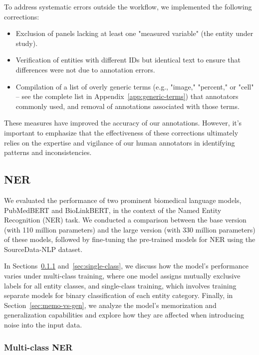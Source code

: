 \documentclass{bioinfo}
\begin{document}
To address systematic errors outside the workflow, we implemented the following corrections:
\begin{itemize}
    \item[1.] Exclusion of panels lacking at least one "measured variable" (the entity under study).
    \item[2.] Verification of entities with different IDs but identical text to ensure that differences were not due to annotation errors.
    \item[3.] Compilation of a list of overly generic terms (e.g., "image," "percent," or "cell" – see the complete list in Appendix~\ref{app:generic-terms}) that annotators commonly used, and removal of annotations associated with those terms.
\end{itemize}

These measures have improved the accuracy of our annotations. However, it's important to emphasize that the effectiveness of these corrections ultimately relies on the expertise and vigilance of our human annotators in identifying patterns and inconsistencies.
 
\subsection{NER}\label{sec:results-ner}

We evaluated the performance of two prominent biomedical language models, PubMedBERT and BioLinkBERT, in the context of the Named Entity Recognition (NER) task. We conducted a comparison between the base version (with 110 million parameters) and the large version (with 330 million parameters) of these models, followed by fine-tuning the pre-trained models for NER using the SourceData-NLP dataset.

In Sections~\ref{sec:multi-class} and~\ref{sec:single-class}, we discuss how the model's performance varies under multi-class training, where one model assigns mutually exclusive labels for all entity classes, and single-class training, which involves training separate models for binary classification of each entity category. Finally, in Section~\ref{sec:memo-vs-gen}, we analyze the model's memorization and generalization capabilities and explore how they are affected when introducing noise into the input data.

\subsubsection{Multi-class NER}\label{sec:multi-class}
\end{document}
